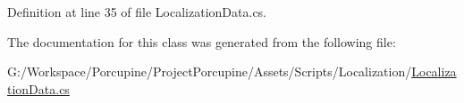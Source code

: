 Definition at line 35 of file Localization\+Data.\+cs.



The documentation for this class was generated from the following file\+:\begin{DoxyCompactItemize}
\item 
G\+:/\+Workspace/\+Porcupine/\+Project\+Porcupine/\+Assets/\+Scripts/\+Localization/\hyperlink{_localization_data_8cs}{Localization\+Data.\+cs}\end{DoxyCompactItemize}
